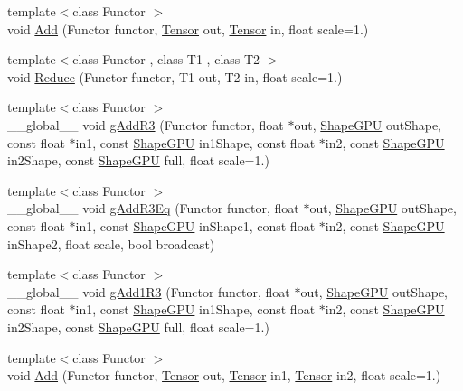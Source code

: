 \begin{DoxyCompactItemize}
{\footnotesize template$<$class Functor $>$ }\\void \hyperlink{namespacemarian_a0ee0e667d3fcfdc776e4dddaffeea6e2}{Add} (Functor functor, \hyperlink{namespacemarian_a88b71ec34bb354564cddc24eb80f7e14}{Tensor} out, \hyperlink{namespacemarian_a88b71ec34bb354564cddc24eb80f7e14}{Tensor} in, float scale=1.)
\item 
{\footnotesize template$<$class Functor , class T1 , class T2 $>$ }\\void \hyperlink{namespacemarian_ad1f1697aac9247a78d2242921d538402}{Reduce} (Functor functor, T1 out, T2 in, float scale=1.)
\item 
{\footnotesize template$<$class Functor $>$ }\\\+\_\+\+\_\+global\+\_\+\+\_\+ void \hyperlink{namespacemarian_a690541df38dba6c9e5fbd9237945f673}{g\+Add\+R3} (Functor functor, float $\ast$out, \hyperlink{structmarian_1_1ShapeGPU}{Shape\+G\+PU} out\+Shape, const float $\ast$in1, const \hyperlink{structmarian_1_1ShapeGPU}{Shape\+G\+PU} in1\+Shape, const float $\ast$in2, const \hyperlink{structmarian_1_1ShapeGPU}{Shape\+G\+PU} in2\+Shape, const \hyperlink{structmarian_1_1ShapeGPU}{Shape\+G\+PU} full, float scale=1.)
\item 
{\footnotesize template$<$class Functor $>$ }\\\+\_\+\+\_\+global\+\_\+\+\_\+ void \hyperlink{namespacemarian_a0a08b33ffd2a9dfa67f0994a15685cd0}{g\+Add\+R3\+Eq} (Functor functor, float $\ast$out, \hyperlink{structmarian_1_1ShapeGPU}{Shape\+G\+PU} out\+Shape, const float $\ast$in1, const \hyperlink{structmarian_1_1ShapeGPU}{Shape\+G\+PU} in\+Shape1, const float $\ast$in2, const \hyperlink{structmarian_1_1ShapeGPU}{Shape\+G\+PU} in\+Shape2, float scale, bool broadcast)
\item 
{\footnotesize template$<$class Functor $>$ }\\\+\_\+\+\_\+global\+\_\+\+\_\+ void \hyperlink{namespacemarian_a44155273ebd81acda4f4878c7c9b6077}{g\+Add1\+R3} (Functor functor, float $\ast$out, \hyperlink{structmarian_1_1ShapeGPU}{Shape\+G\+PU} out\+Shape, const float $\ast$in1, const \hyperlink{structmarian_1_1ShapeGPU}{Shape\+G\+PU} in1\+Shape, const float $\ast$in2, const \hyperlink{structmarian_1_1ShapeGPU}{Shape\+G\+PU} in2\+Shape, const \hyperlink{structmarian_1_1ShapeGPU}{Shape\+G\+PU} full, float scale=1.)
\item 
{\footnotesize template$<$class Functor $>$ }\\void \hyperlink{namespacemarian_a1876c27c6adb42553caa12d2c267e074}{Add} (Functor functor, \hyperlink{namespacemarian_a88b71ec34bb354564cddc24eb80f7e14}{Tensor} out, \hyperlink{namespacemarian_a88b71ec34bb354564cddc24eb80f7e14}{Tensor} in1, \hyperlink{namespacemarian_a88b71ec34bb354564cddc24eb80f7e14}{Tensor} in2, float scale=1.)

\end{DoxyCompactItemize}

